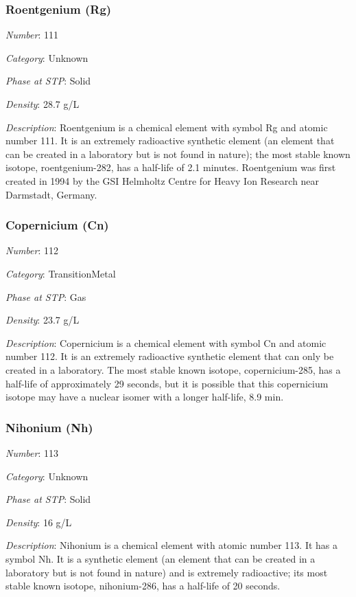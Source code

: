 \documentclass{article}
\begin{document}
\hypertarget{subsubsection::Rg}{}\subsubsection{Roentgenium (Rg)}

\textit{Number}: 111

\textit{Category}: Unknown

\textit{Phase at STP}: Solid

\textit{Density}: 28.7 g/L

\textit{Description}: Roentgenium is a chemical element with symbol Rg and atomic number 111. It is an extremely radioactive synthetic element (an element that can be created in a laboratory but is not found in nature); the most stable known isotope, roentgenium-282, has a half-life of 2.1 minutes. Roentgenium was first created in 1994 by the GSI Helmholtz Centre for Heavy Ion Research near Darmstadt, Germany.

\hypertarget{subsubsection::Cn}{}\subsubsection{Copernicium (Cn)}

\textit{Number}: 112

\textit{Category}: TransitionMetal

\textit{Phase at STP}: Gas

\textit{Density}: 23.7 g/L

\textit{Description}: Copernicium is a chemical element with symbol Cn and atomic number 112. It is an extremely radioactive synthetic element that can only be created in a laboratory. The most stable known isotope, copernicium-285, has a half-life of approximately 29 seconds, but it is possible that this copernicium isotope may have a nuclear isomer with a longer half-life, 8.9 min.

\hypertarget{subsubsection::Nh}{}\subsubsection{Nihonium (Nh)}

\textit{Number}: 113

\textit{Category}: Unknown

\textit{Phase at STP}: Solid

\textit{Density}: 16 g/L

\textit{Description}: Nihonium is a chemical element with atomic number 113. It has a symbol Nh. It is a synthetic element (an element that can be created in a laboratory but is not found in nature) and is extremely radioactive; its most stable known isotope, nihonium-286, has a half-life of 20 seconds.
\end{document}

